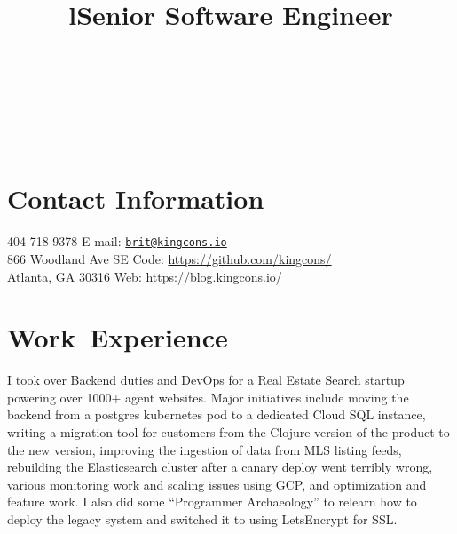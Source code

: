 \documentclass[margintitle,line]{res}
\begin{document}

\begin{resume}

\begin{format}
\\
\title{l}\\
\body\\
\end{format}



\section{Contact Information}

404-718-9378 \hfill {E-mail:} \href{mailto:brit@kingcons.io}{\nolinkurl{brit@kingcons.io}} \\
866 Woodland Ave SE \hfill {Code:} \url{https://github.com/kingcons/} \\
Atlanta, GA 30316 \hfill {Web:} \url{https://blog.kingcons.io/} \\


\section{\mbox{Work Experience}}

\title{Senior Software Engineer}
\begin{position}
  I took over Backend duties and DevOps for a Real Estate Search startup powering over 1000+
  agent websites. Major initiatives include moving the backend from a postgres kubernetes pod to
  a dedicated Cloud SQL instance, writing a migration tool for customers from the Clojure version
  of the product to the new version, improving the ingestion of data from MLS listing feeds,
  rebuilding the Elasticsearch cluster after a canary deploy went terribly wrong,
  various monitoring work and scaling issues using GCP, and optimization and feature work.
  I also did some ``Programmer Archaeology'' to relearn how to deploy the legacy system
  and switched it to using LetsEncrypt for SSL.
\end{position}


\end{resume}
\end{document}
